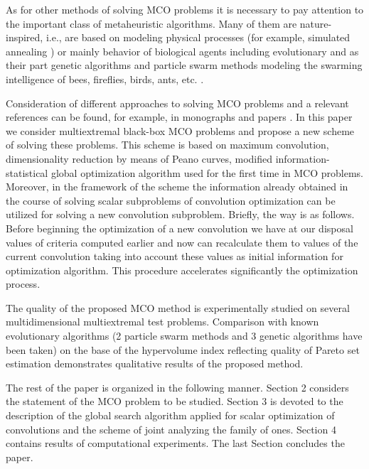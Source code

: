 \documentclass[runningheads]{llncs}
\begin{document}
As for other methods of solving MCO problems it is necessary to pay attention to the important class of metaheuristic algorithms. Many of them are nature-inspired, i.e.,  are  based on modeling physical processes (for example, simulated annealing \cite{Locatelli2002,Aarts2014}) or mainly behavior of biological agents including evolutionary \cite{Price2005,Coello2007} and as their part genetic algorithms \cite{Ruiz2015,Deb2002,Zitzler2001} and particle swarm methods modeling the swarming intelligence of bees, fireflies, birds, ants, etc. \cite{Mostaghim2007,Nebro2009,Durillo2010}.

Consideration of different approaches to solving MCO problems and a relevant references can be found, for example, in monographs and papers \cite{Miettinen1999,Ehrgott2005,Zhou2011,Nedjah2015,Pardalos2017}.
In this paper we consider multiextremal black-box MCO problems and propose a new scheme of solving these problems. This scheme is based on maximum convolution, dimensionality reduction by means of Peano curves, modified information-statistical global optimization algorithm used for the first time in MCO problems. Moreover, in the framework of the scheme the information already obtained in the course of solving scalar subproblems of convolution optimization can be utilized for solving a new convolution subproblem. Briefly, the way is as follows. Before beginning the optimization of a new convolution we have at our disposal values of criteria computed earlier and now can recalculate them to values of the current convolution taking into account these values as initial information for optimization algorithm. This procedure accelerates significantly the optimization process.

The quality of the proposed MCO method is experimentally studied on several multidimensional multiextremal test problems. Comparison with known evolutionary algorithms (2 particle swarm methods and 3 genetic algorithms have been taken) on the base of the hypervolume index \cite{Evtushenko2014,Zilinskas2015} reflecting quality of Pareto set estimation demonstrates qualitative results of the proposed method.

The rest of the paper is organized in the following manner. Section 2 considers the statement of the MCO problem to be studied. Section 3 is devoted to the description of the global search algorithm applied for scalar optimization of convolutions and the scheme of joint analyzing the family of ones. Section 4 contains results of computational experiments. The last Section concludes the paper.
\end{document}
